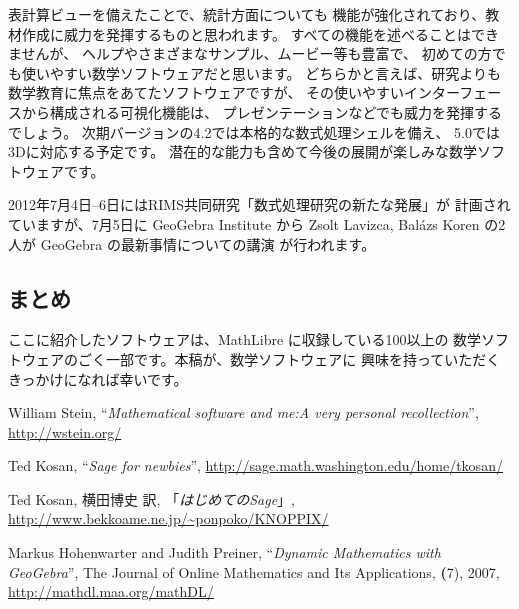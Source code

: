 \documentclass[mingoth,a4paper]{jsarticle}
\begin{document}
表計算ビューを備えたことで、統計方面についても
機能が強化されており、教材作成に威力を発揮するものと思われます。
すべての機能を述べることはできませんが、
ヘルプやさまざまなサンプル、ムービー等も豊富で、
初めての方でも使いやすい数学ソフトウェアだと思います。
どちらかと言えば、研究よりも数学教育に焦点をあてたソフトウェアですが、
その使いやすいインターフェースから構成される可視化機能は、
プレゼンテーションなどでも威力を発揮するでしょう。
次期バージョンの4.2では本格的な数式処理シェルを備え、
5.0では3Dに対応する予定です。
潜在的な能力も含めて今後の展開が楽しみな数学ソフトウェアです。

2012年7月4日--6日にはRIMS共同研究「数式処理研究の新たな発展」が
計画されていますが、7月5日に GeoGebra Institute から
Zsolt Lavizca, Bal\'azs Koren の2人が GeoGebra の最新事情についての講演
が行われます。

\subsection{まとめ}
ここに紹介したソフトウェアは、MathLibre に収録している100以上の
数学ソフトウェアのごく一部です。本稿が、数学ソフトウェアに
興味を持っていただくきっかけになれば幸いです。

\begin{thebibliography}{99}

William Stein,
``\emph{Mathematical software and me:A very personal recollection}'',
\url{http://wstein.org/}

Ted Kosan,
``\emph{Sage for newbies}'',
\url{http://sage.math.washington.edu/home/tkosan/}

Ted Kosan, 横田博史 訳,
「\emph{はじめてのSage}」,
\url{http://www.bekkoame.ne.jp/~ponpoko/KNOPPIX/}

Markus Hohenwarter and Judith Preiner,
``\emph{Dynamic Mathematics with GeoGebra}'',
The Journal of Online Mathematics and Its Applications,
\textbf(7), 2007, \url{http://mathdl.maa.org/mathDL/}
\end{thebibliography}



\label{sec:ipython-notebook}
\end{document}
